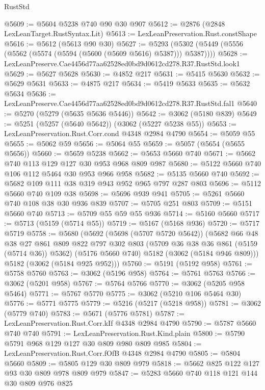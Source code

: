 \begin{lexlean}{RustStd}
\begin{coremodule}
@5609 := @5604 @5238 @740 @90 @30 @907
@5612 := @2876 (@2848 LexLeanTarget.RustSyntax.Lit)
@5613 := LexLeanPreservation.Rust.constShape
@5616 := @5612 (@5613 @90 @30)
@5627 := @5293 (@5302 (@5449 (@5556 (@5562 (@5574 (@5594 (@5600 (@5609 @5616) @5387))) @5387))))
@5628 := LexLeanPreserve.Cae4456d77aa62528ed0bd9d0612cd278.R37.RustStd.look1
@5629 := @5627 @5628
@5630 := @4852 @217
@5631 := @5415 @5630
@5632 := @5629 @5631
@5633 := @4875 @217
@5634 := @5419 @5633
@5635 := @5632 @5634
@5636 := LexLeanPreserve.Cae4456d77aa62528ed0bd9d0612cd278.R37.RustStd.fal1
@5640 := @5270 (@5279 (@5635 @5636 @5446))
@5642 := @3062 (@5180 @839)
@5649 := @5251 (@5257 (@5640 @5642)) (@3062 (@5227 @5238 @55))
@5653 := LexLeanPreservation.Rust.Corr.cond @4348 @2984 @4790
@5654 := @5059 @55
@5655 := @5062 @59
@5656 := @5064 @55
@5659 := @5057 (@5654 (@5655 @5656))
@5660 := @5659 @5238
@5662 := @5653 @5660 @740
@5671 := @5662 @740 @113 @129 @127 @30 @953 @968 @809 @987
@5680 := @5122 @5660 @740 @106 @112 @5464 @30 @953 @966 @958
@5682 := @5135 @5660 @740
@5692 := @5682 @109 @111 @38 @319 @943 @952 @965 @797 @287 @803
@5696 := @5112 @5660 @740 @109 @38
@5698 := @5696 @939 @941
@5705 := @5261 @5660 @740 @108 @38 @30 @936 @839
@5707 := @5705 @251 @803
@5709 := @5151 @5660 @740
@5713 := @5709 @55 @59 @55 @936
@5714 := @5160 @5660
@5717 := @5713 (@5159 (@5714 @55))
@5719 := @5167 (@5168 @936)
@5720 := @5717 @5719
@5758 := @5680
    (@5692
      (@5698 (@5707 @5720 @5642))
      (@5682
        @66
        @48
        @38
        @27
        @861
        @809
        @822
        @797
        @302
        @803
        (@5709 @36 @38 @36 @861 (@5159 (@5714 @36)) @5362)
        (@5176 @5660 @740)
        @5182
        (@3062 (@5184 @946 @809)))
      @5182
      (@3062 (@5184 @925 @952)))
@5760 := @5191 (@5192 @958)
@5761 := @5758 @5760
@5763 := @3062 (@5196 @958)
@5764 := @5761 @5763
@5766 := @3062 (@5201 @958)
@5767 := @5764 @5766
@5770 := @3062 (@5205 @958 @5464)
@5771 := @5767 @5770
@5775 := @3062 (@5210 @106 @5464 @30)
@5776 := @5771 @5775
@5779 := @5216 (@5217 (@5218 @958))
@5781 := @3062 (@5779 @740)
@5783 := @5671 (@5776 @5781)
@5787 := LexLeanPreservation.Rust.Corr.kIf @4348 @2984 @4790
@5790 := @5787 @5660 @740 @740
@5791 := LexLeanPreservation.Rust.Kind.plain
@5800 := @5790 @5791 @968 @129 @127 @30 @809 @980 @809 @985
@5804 := LexLeanPreservation.Rust.Corr.fOfB @4348 @2984 @4790
@5805 := @5804 @5660
@5809 := @5805 @129 @30 @809 @979
@5818 := @5662 @825 @122 @127 @93 @30 @809 @978 @809 @979
@5847 := @5283
    @5660
    @740
    @118
    @121
    @144
    @30
    @809
    @976
    @825

\end{coremodule}
\end{lexlean}
